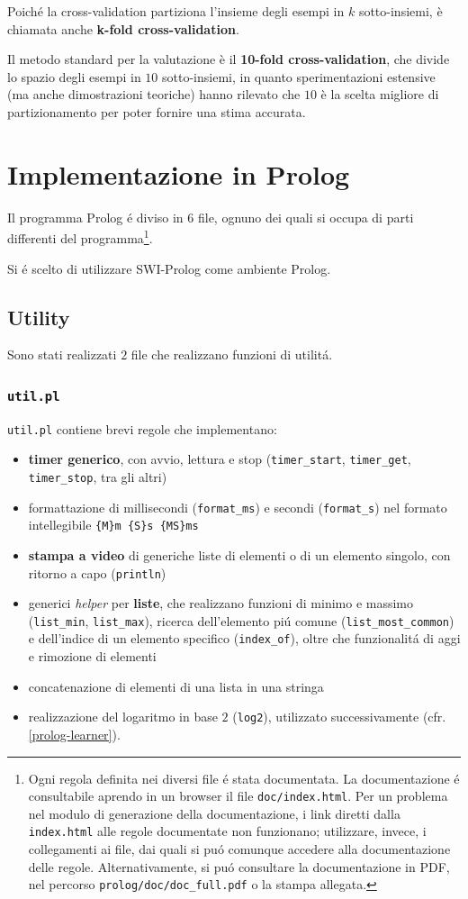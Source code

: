 \documentclass[preprint]{acm_proc_article-sp}
\begin{document}
Poiché la cross-validation partiziona l'insieme degli esempi in $k$ sotto-insiemi, è chiamata anche \textbf{k-fold cross-validation}.

Il metodo standard per la valutazione è il \textbf{10-fold cross-validation}, che divide lo spazio degli esempi in $10$ sotto-insiemi, in quanto sperimentazioni estensive (ma anche dimostrazioni teoriche) hanno rilevato che $10$ è la scelta migliore di partizionamento per poter fornire una stima accurata.

\section{Implementazione in Prolog}
\label{prolog}
Il programma Prolog \'e diviso in $6$ file, ognuno dei quali si occupa di parti differenti del programma\footnote{Ogni regola definita nei diversi file \'e stata documentata. La documentazione \'e consultabile aprendo in un browser il file \texttt{doc/index.html}. Per un problema nel modulo di generazione della documentazione, i link diretti dalla \texttt{index.html} alle regole documentate non funzionano; utilizzare, invece, i collegamenti ai file, dai quali si pu\'o comunque accedere alla documentazione delle regole. Alternativamente, si pu\'o consultare la documentazione in PDF, nel percorso \verb|prolog/doc/doc_full.pdf| o la stampa allegata.}.

Si \'e scelto di utilizzare SWI-Prolog\cite{SWI:2014:Online} come ambiente Prolog.

\subsection{Utility}
\label{prolog-utility}
Sono stati realizzati $2$ file che realizzano funzioni di utilit\'a.

\subsubsection{\texttt{util.pl}}
\verb|util.pl| contiene brevi regole che implementano:
\begin{itemize}
\item \textbf{timer generico}, con avvio, lettura e stop (\verb|timer_start|, \verb|timer_get|, \verb|timer_stop|, tra gli altri)
\item formattazione di millisecondi (\verb|format_ms|) e secondi (\verb|format_s|) nel formato intellegibile \texttt{\{M\}m \{S\}s \{MS\}ms}
\item \textbf{stampa a video} di generiche liste di elementi o di un elemento singolo, con ritorno a capo (\verb|println|)
\item generici \textit{helper} per \textbf{liste}, che realizzano funzioni di minimo e massimo (\verb|list_min|, \verb|list_max|), ricerca dell'elemento pi\'u comune (\verb|list_most_common|) e dell'indice di un elemento specifico (\verb|index_of|), oltre che funzionalit\'a di aggi e rimozione di elementi
\item concatenazione di elementi di una lista in una stringa
\item realizzazione del logaritmo in base $2$ (\verb|log2|), utilizzato successivamente (cfr. \ref{prolog-learner}).
\end{itemize}
\end{document}
